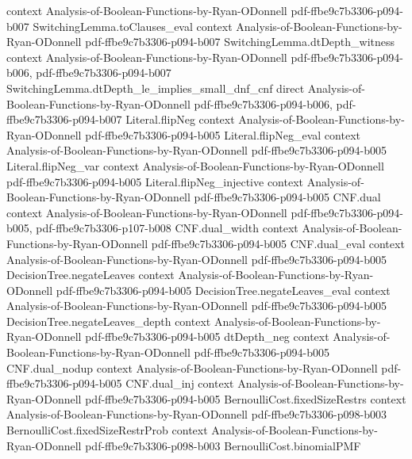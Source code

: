 \begin{lemma}
  {context}
  {Analysis-of-Boolean-Functions-by-Ryan-ODonnell}
  {pdf-ffbe9c7b3306-p094-b007}
\proofstep
  {SwitchingLemma.toClauses_eval}
  {context}
  {Analysis-of-Boolean-Functions-by-Ryan-ODonnell}
  {pdf-ffbe9c7b3306-p094-b007}
\proofstep
  {SwitchingLemma.dtDepth_witness}
  {context}
  {Analysis-of-Boolean-Functions-by-Ryan-ODonnell}
  {pdf-ffbe9c7b3306-p094-b006,
    pdf-ffbe9c7b3306-p094-b007}
\proofstep
  {SwitchingLemma.dtDepth_le_implies_small_dnf_cnf}
  {direct}
  {Analysis-of-Boolean-Functions-by-Ryan-ODonnell}
  {pdf-ffbe9c7b3306-p094-b006,
    pdf-ffbe9c7b3306-p094-b007}
\proofstep
  {Literal.flipNeg}
  {context}
  {Analysis-of-Boolean-Functions-by-Ryan-ODonnell}
  {pdf-ffbe9c7b3306-p094-b005}
\proofstep
  {Literal.flipNeg_eval}
  {context}
  {Analysis-of-Boolean-Functions-by-Ryan-ODonnell}
  {pdf-ffbe9c7b3306-p094-b005}
\proofstep
  {Literal.flipNeg_var}
  {context}
  {Analysis-of-Boolean-Functions-by-Ryan-ODonnell}
  {pdf-ffbe9c7b3306-p094-b005}
\proofstep
  {Literal.flipNeg_injective}
  {context}
  {Analysis-of-Boolean-Functions-by-Ryan-ODonnell}
  {pdf-ffbe9c7b3306-p094-b005}
\proofstep
  {CNF.dual}
  {context}
  {Analysis-of-Boolean-Functions-by-Ryan-ODonnell}
  {pdf-ffbe9c7b3306-p094-b005,
    pdf-ffbe9c7b3306-p107-b008}
\proofstep
  {CNF.dual_width}
  {context}
  {Analysis-of-Boolean-Functions-by-Ryan-ODonnell}
  {pdf-ffbe9c7b3306-p094-b005}
\proofstep
  {CNF.dual_eval}
  {context}
  {Analysis-of-Boolean-Functions-by-Ryan-ODonnell}
  {pdf-ffbe9c7b3306-p094-b005}
\proofstep
  {DecisionTree.negateLeaves}
  {context}
  {Analysis-of-Boolean-Functions-by-Ryan-ODonnell}
  {pdf-ffbe9c7b3306-p094-b005}
\proofstep
  {DecisionTree.negateLeaves_eval}
  {context}
  {Analysis-of-Boolean-Functions-by-Ryan-ODonnell}
  {pdf-ffbe9c7b3306-p094-b005}
\proofstep
  {DecisionTree.negateLeaves_depth}
  {context}
  {Analysis-of-Boolean-Functions-by-Ryan-ODonnell}
  {pdf-ffbe9c7b3306-p094-b005}
\proofstep
  {dtDepth_neg}
  {context}
  {Analysis-of-Boolean-Functions-by-Ryan-ODonnell}
  {pdf-ffbe9c7b3306-p094-b005}
\proofstep
  {CNF.dual_nodup}
  {context}
  {Analysis-of-Boolean-Functions-by-Ryan-ODonnell}
  {pdf-ffbe9c7b3306-p094-b005}
\proofstep
  {CNF.dual_inj}
  {context}
  {Analysis-of-Boolean-Functions-by-Ryan-ODonnell}
  {pdf-ffbe9c7b3306-p094-b005}
\proofstep
  {BernoulliCost.fixedSizeRestrs}
  {context}
  {Analysis-of-Boolean-Functions-by-Ryan-ODonnell}
  {pdf-ffbe9c7b3306-p098-b003}
\proofstep
  {BernoulliCost.fixedSizeRestrProb}
  {context}
  {Analysis-of-Boolean-Functions-by-Ryan-ODonnell}
  {pdf-ffbe9c7b3306-p098-b003}
\proofstep
  {BernoulliCost.binomialPMF}

\end{lemma}
